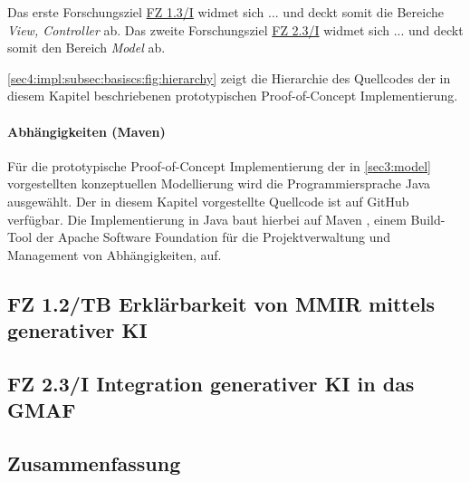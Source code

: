 Das erste Forschungsziel \hyperref[sec4:impl:subsec:fz-explainability]{FZ 1.3/I} widmet sich ... und deckt somit die Bereiche \textit{View, Controller} ab.
Das zweite Forschungsziel \hyperref[sec4:impl:subsec:fz-integration]{FZ 2.3/I} widmet sich ... und deckt somit den Bereich \textit{Model} ab.

\cref{sec4:impl:subsec:basiscs:fig:hierarchy} zeigt die Hierarchie des Quellcodes der in diesem Kapitel beschriebenen prototypischen Proof-of-Concept Implementierung.



\paragraph{Abhängigkeiten (Maven)}
Für die prototypische Proof-of-Concept Implementierung der in \cref{sec3:model} vorgestellten konzeptuellen Modellierung wird die Programmiersprache Java \cite{java} ausgewählt.
Der in diesem Kapitel vorgestellte Quellcode ist auf GitHub verfügbar.
Die Implementierung in Java baut hierbei auf Maven \cite{maven}, einem Build-Tool der Apache Software Foundation für die Projektverwaltung und Management von Abhängigkeiten, auf.

\clearpage

\subsection[FZ 1.3/I Erklärbarkeit von MMIR mittels generativer KI]{\texorpdfstring{FZ 1.2/TB Erklärbarkeit von MMIR mittels \\ generativer KI}{FZ 1.3/I Erklärbarkeit von MMIR mittels generativer KI}}
\label{sec4:impl:subsec:fz-explainability}

\clearpage

\subsection{FZ 2.3/I Integration generativer KI in das GMAF}
\label{sec4:impl:subsec:fz-integration}

\clearpage

\subsection{Zusammenfassung}
\label{sec4:impl:subsec:summary}